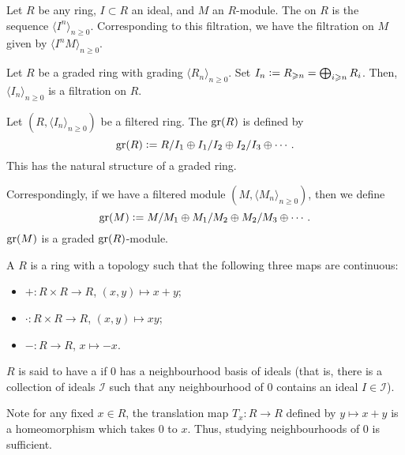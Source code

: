 \documentclass[12pt]{article}
\begin{document}
\begin{ex}
	Let $R$ be any ring, $I \subset R$ an ideal, and $M$ an $R$-module. The  on $R$ is the sequence $\langle I^{n} \rangle_{n \ge 0}$. Corresponding to this filtration, we have the filtration on $M$ given by $\langle I^{n} M \rangle_{n \ge 0}$.
\end{ex}

\begin{ex}
	Let $R$ be a graded ring with grading $\langle R_{n} \rangle_{n \ge 0}$. Set $I_{n} \vcentcolon= R_{\ge n} = \bigoplus_{i \ge n} R_{i}$. \newline
	Then, $\langle I_{n} \rangle_{n \ge 0}$ is a filtration on $R$.
\end{ex}

\begin{defn}
	Let $(R, \langle I_{n} \rangle_{n \ge 0})$ be a filtered ring. The  $\gr(R)$ is defined by
	\begin{equation*} 
		\gr(R) \vcentcolon= R/I_{1} \oplus I_{1}/I_{2} \oplus I_{2}/I_{3} \oplus \cdots.
	\end{equation*}
	This has the natural structure of a graded ring.

	Correspondingly, if we have a filtered module $(M, \langle M_{n} \rangle_{n \ge 0})$, then we define
	\begin{equation*} 
		\gr(M) \vcentcolon= M/M_{1} \oplus M_{1}/M_{2} \oplus M_{2}/M_{3} \oplus \cdots.
	\end{equation*}
	$\gr(M)$ is a graded $\gr(R)$-module.
\end{defn}

\begin{defn}
	A  $R$ is a ring with a topology such that the following three maps are continuous:
	\begin{itemize}
		\item $+ : R \times R \to R$, $(x, y) \mapsto x + y$;
		\item $\cdot : R \times R \to R$, $(x, y) \mapsto x y$;
		\item $- : R \to R$, $x \mapsto -x$.
	\end{itemize}

	$R$ is said to have a  if $0$ has a neighbourhood basis of ideals (that is, there is a collection of ideals $\mathcal{I}$ such that any neighbourhood of $0$ contains an ideal $I \in \mathcal{I}$).
\end{defn}

Note for any fixed $x \in R$, the translation map $T_{x} : R \to R$ defined by $y \mapsto x + y$ is a homeomorphism which takes $0$ to $x$. Thus, studying neighbourhoods of $0$ is sufficient.
\end{document}
